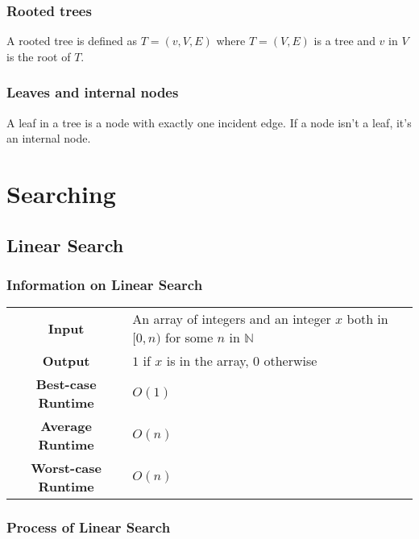 \documentclass[a4paper, 12pt, twoside]{article}
\begin{document}
\subsubsection{Rooted trees}

A rooted tree is defined as $T = (v, V, E)$ where $T = (V, E)$ is a
tree and $v$ in $V$ is the root of $T$.

\subsubsection{Leaves and internal nodes}

A leaf in a tree is a node with exactly one incident edge. If a node
isn't a leaf, it's an internal node.

\section{Searching}

\subsection{Linear Search}

\subsubsection{Information on Linear Search}

\begin{center}
      \begin{tabular}{ || c | p{8.5cm} || }
            \hline
                  \textbf{Input} & An array of integers and an integer
                        $x$ both in $[0, n)$ for some $n$ in $\mathbb{N}$ \\
                  \textbf{Output} & $1$ if $x$ is in the array, $0$
                        otherwise \\
            \hline\hline
                  \textbf{Best-case Runtime} & $O(1)$ \\
                  \textbf{Average Runtime} & $O(n)$ \\
                  \textbf{Worst-case Runtime} & $O(n)$ \\
            \hline
      \end{tabular}
\end{center}

\subsubsection{Process of Linear Search}
\end{document}

